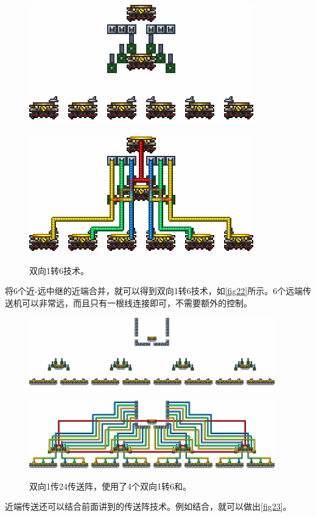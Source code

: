 \begin{figure}[!ht]
\centering
\includegraphics{images/385.png}\\
\mbox{}\\
\includegraphics{images/386.png}
\caption{双向1转6技术。}\label{fig22}
\end{figure}
将6个近-远中继的近端合并，就可以得到双向1转6技术，如\autoref{fig22}所示。6个远端传送机可以非常远，而且只有一根线连接即可，不需要额外的控制。

\begin{figure}[!ht]
\centering
\includegraphics[width=0.95\textwidth]{images/387.png}\\
\mbox{}\\
\includegraphics[width=0.95\textwidth]{images/388.png}
\caption{双向1传24传送阵，使用了4个双向1转6和。}\label{fig23}
\end{figure}
近端传送还可以结合前面讲到的传送阵技术。例如结合，就可以做出\autoref{fig23}。

